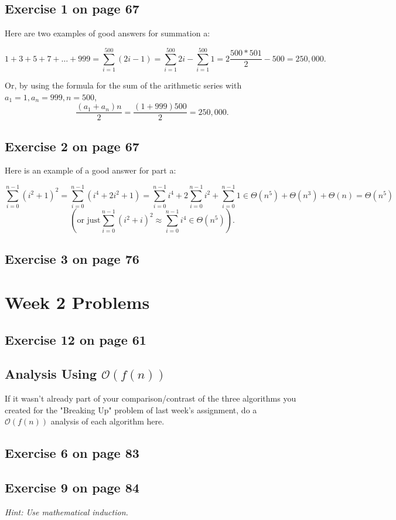 \documentclass[12pt]{amsart}
\begin{document}
\subsection{Exercise 1 on page 67} $ $\\ 

  Here are two examples of good answers for summation a:

  \[1 + 3 + 5 + 7 + \ldots + 999 = \sum_{i = 1}^{500} (2i - 1) = \sum_{i = 1}^{500} 2i - \sum_{i = 1}^{500} 1
= 2 \frac{500 * 501}{2} - 500 = 250,000.\]

Or, by using the formula for the sum of the arithmetic series with
  $a_1 = 1, a_n = 999, n = 500$, 
  \[\frac{(a_1 + a_n)n}{2} = \frac{(1+999)500}{2} = 250,000.\]

\subsection{Exercise 2 on page 67} $ $\\ 

  Here is an example of a good answer for part a:

\[ \sum_{i = 0}^{n - 1} (i^2 + 1)^2 = \sum_{i = 0}^{n - 1}(i^4 + 2i^2 + 1) = \sum_{i = 0}^{n - 1} i^4 + 2 \sum_{i = 0}^{n - 1} i^2 + \sum_{i = 0}^{n - 1} 1 \in \Theta(n^5) + \Theta(n^3) + \Theta(n) = \Theta(n^5)
\]
\[(\mbox{or just} \sum_{i = 0}^{n - 1} (i^2 + i)^2 \approx \sum_{i = 0}^{n - 1} i^4 \in \Theta(n^5)).
\]


\subsection{Exercise 3 on page 76}

   
\section{Week 2 Problems}

\subsection{Exercise 12 on page 61}

\subsection{Analysis Using $\mathcal{O}(f(n))$}
   If it wasn't already part of your comparison/contrast of the three algorithms
  you created for the "Breaking Up" problem of last week's assignment, do a
  $\mathcal{O}(f(n))$ analysis of each algorithm here.

\subsection{Exercise 6 on page 83}


\subsection{Exercise 9 on page 84} $ $\\ 

   \textit{Hint: Use mathematical induction.}
\end{document}
